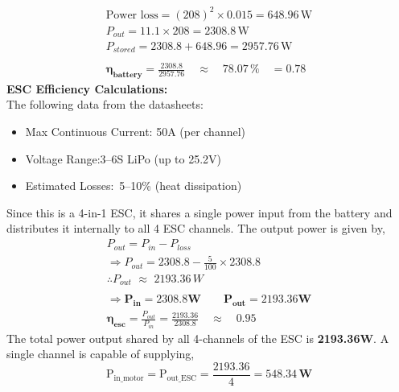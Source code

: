 \documentclass[12pt]{report}
\begin{document}
    \begin{gather*}
      \text{Power loss} = (208)^2 \times 0.015 = 648.96 \, \text{W} \\
      P_{out} = 11.1 \times 208 = 2308.8 \, \text{W} \\
      P_{stored} = 2308.8 + 648.96 = 2957.76 \, \text{W} \\ \\
      \boldsymbol{\eta_{battery}} = \frac{2308.8}{2957.76} \quad \approx \quad 78.07\, \% \quad = \boldsymbol{0.78}
    \end{gather*}
      \textbf{\large ESC Efficiency Calculations:}\\
      The following data from the datasheets:
      \begin{itemize}
        \item Max Continuous Current:	\hfill50A (per channel)
        \item Voltage Range:\hfill	3–6S LiPo (up to 25.2V)
        \item Estimated Losses:\hfill	~5–10\% (heat dissipation)
      \end{itemize}
      Since this is a 4-in-1 ESC, it shares a single power input from the battery and distributes it internally to all 4 ESC channels. The output power is given by,
      \begin{gather*} 
        P_{out} = P_{in} - P_{loss}\\
        \Rightarrow P_{out} = 2308.8 - \frac{5}{100} \times 2308.8 \\
        \therefore P_{out} \,\, \approx \,\, 2193.36 \, W \\ \\
        \Rightarrow \boldsymbol{P_{in} = 2308.8W} \quad \quad \boldsymbol{P_{out} = 2193.36W} \\ 
        \boldsymbol{\eta_{esc}} = \frac{P_{out}}{P_{in}} = \frac{2193.36}{2308.8} \quad \approx \quad \boldsymbol{0.95}
      \end{gather*}
      The total power output shared by all 4-channels of the ESC is \textbf{2193.36W}. A single channel is capable of supplying, \[ \mathrm{P_{in\_motor}} = \mathrm{P_{out\_ESC}} = \frac{2193.36}{4} = \boldsymbol{548.34 \, \text{W}} \]
      \vspace{0.5in}
\end{document}
